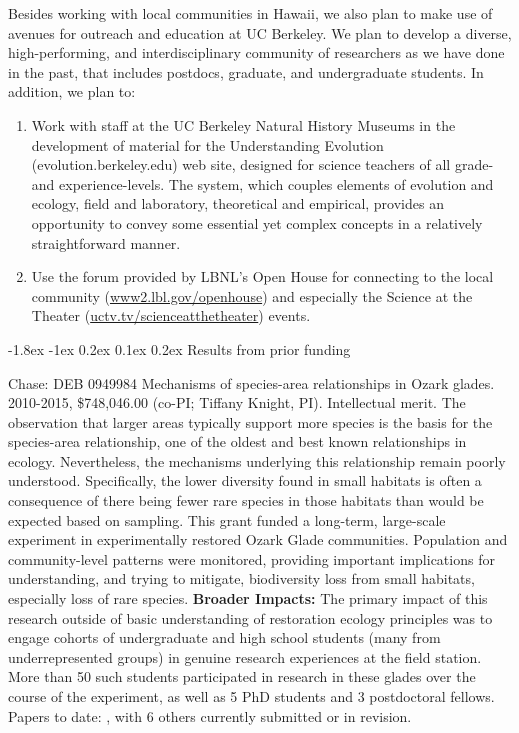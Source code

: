 \documentclass[11pt]{article}
\makeatletter
\renewcommand\section{\@startsection{section}{1}{\z@}%
                                  {-1.8ex \@plus -1ex \@minus 0.2ex}%
                                  {0.1ex \@plus 0.2ex}%
                                  {\normalfont\Large\bfseries}}
\renewcommand{\paragraph}{\@startsection{paragraph}{4}{\z@}
  {1ex \@plus 1ex \@minus .2ex}{-1em}
  {\normalfont\normalsize\it}
}
\makeatother
\begin{document}
Besides working with local communities in Hawaii, we also plan to make
use of avenues for outreach and education at UC Berkeley. We plan to
develop a diverse, high-performing, and interdisciplinary
\citep{cheruvelil2014, goring2014} community of researchers as we have
done in the past, that includes postdocs, graduate, and undergraduate
students. In addition, we plan to:
\begin{enumerate}
\item Work with staff at the UC Berkeley Natural History Museums in
  the development of material for the Understanding Evolution
  (evolution.berkeley.edu) web site, designed for science
  teachers of all grade- and experience-levels. The system, which
  couples elements of evolution and ecology, field and laboratory,
  theoretical and empirical, provides an opportunity to convey some
  essential yet complex concepts in a relatively straightforward
  manner.
\item Use the forum provided by LBNL's Open House for connecting to
  the local community (\url{www2.lbl.gov/openhouse}) and
  especially the Science at the Theater
  (\url{uctv.tv/scienceatthetheater}) events.
\end{enumerate}

\section{Results from prior funding}

\paragraph{Chase:} DEB 0949984 Mechanisms of species-area
relationships in Ozark glades. 2010-2015, \$748,046.00 (co-PI; Tiffany
Knight, PI). Intellectual merit. The observation that larger areas
typically support more species is the basis for the species-area
relationship, one of the oldest and best known relationships in
ecology. Nevertheless, the mechanisms underlying this relationship
remain poorly understood. Specifically, the lower diversity found in
small habitats is often a consequence of there being fewer rare
species in those habitats than would be expected based on
sampling. This grant funded a long-term, large-scale experiment in
experimentally restored Ozark Glade communities. Population and
community-level patterns were monitored, providing important
implications for understanding, and trying to mitigate, biodiversity
loss from small habitats, especially loss of rare species. {\bf
  Broader Impacts:} The primary impact of this research outside of
basic understanding of restoration ecology principles was to engage
cohorts of undergraduate and high school students (many from
underrepresented groups) in genuine research experiences at the field
station. More than 50 such students participated in research in these
glades over the course of the experiment, as well as 5 PhD students
and 3 postdoctoral fellows. Papers to date: \citep{burkle2012,
  chase2013, powell2013, schuler2015}, with 6 others currently
submitted or in revision.
\end{document}
